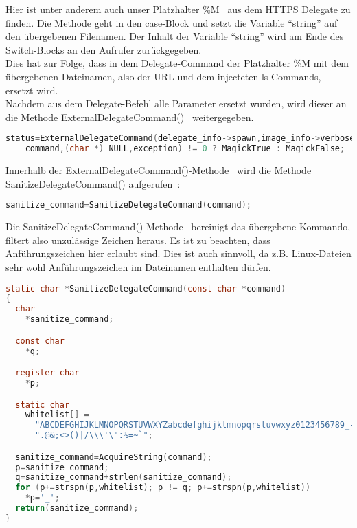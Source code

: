 Hier ist unter anderem auch unser Platzhalter \%M~\cite{caseM} aus dem HTTPS Delegate zu finden.
Die Methode geht in den case-Block und setzt die Variable "`string"' auf den übergebenen Filenamen.
Der Inhalt der Variable "`string"' wird am Ende des Switch-Blocks an den Aufrufer zurückgegeben.\\

Dies hat zur Folge, dass in dem Delegate-Command der Platzhalter \%M mit dem übergebenen Dateinamen,
also der URL und dem injecteten ls-Commands, ersetzt wird.\\

Nachdem aus dem Delegate-Befehl alle Parameter ersetzt wurden, wird dieser an die Methode ExternalDelegateCommand()~\cite{CallExternalDelegateCommand} weitergegeben.

\begin{lstlisting}[firstnumber=1301, language=C, caption=magick/delegate.c Aufruf ExternalDelegateCommand(),label={lst:lstlisting}]
  status=ExternalDelegateCommand(delegate_info->spawn,image_info->verbose,
    command,(char *) NULL,exception) != 0 ? MagickTrue : MagickFalse;
\end{lstlisting}
\vspace{5mm}

Innerhalb der ExternalDelegateCommand()-Methode~\cite{DeklarationExternalDelegateCommand} wird die Methode SanitizeDelegateCommand() aufgerufen~\cite{CallSanatizeDelegateCommand}:

\begin{lstlisting}[firstnumber=395, language=C, caption=magick/delegate.c Aufruf SanitizeDelegateCommand(),label={lst:lstlisting}]
  sanitize_command=SanitizeDelegateCommand(command);
\end{lstlisting}
\vspace{5mm}

\newpage

Die SanitizeDelegateCommand()-Methode~\cite{DeclareSanatizeDelegateCommand} bereinigt das übergebene Kommando, filtert also unzulässige Zeichen heraus.
Es ist zu beachten, dass Anführungszeichen hier erlaubt sind.
Dies ist auch sinnvoll, da z.B. Linux-Dateien sehr wohl Anführungszeichen im Dateinamen enthalten dürfen.

\begin{lstlisting}[firstnumber=322, language=C, caption=magick/delegate.c SanitizieDelegateCommand(),label={lst:lstlisting}]
static char *SanitizeDelegateCommand(const char *command)
{
  char
    *sanitize_command;

  const char
    *q;

  register char
    *p;

  static char
    whitelist[] =
      "ABCDEFGHIJKLMNOPQRSTUVWXYZabcdefghijklmnopqrstuvwxyz0123456789_- "
      ".@&;<>()|/\\\'\":%=~`";

  sanitize_command=AcquireString(command);
  p=sanitize_command;
  q=sanitize_command+strlen(sanitize_command);
  for (p+=strspn(p,whitelist); p != q; p+=strspn(p,whitelist))
    *p='_';
  return(sanitize_command);
}
\end{lstlisting}
\vspace{5mm}

